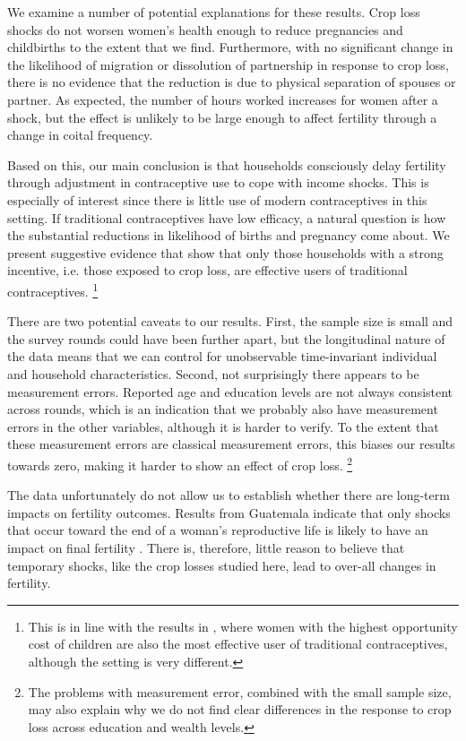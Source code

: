 \documentclass[letterpaper,12pt]{article}
\begin{document}
We examine a number of potential explanations for these results.
Crop loss shocks do not worsen women's health enough to 
reduce pregnancies and childbirths to the extent that we find.
Furthermore, with no significant change in the likelihood of migration or 
dissolution of partnership in response to crop loss, there is no evidence 
that the reduction is due to physical separation of spouses or partner.
As expected, the number of hours worked increases for women after a shock, 
but the effect is unlikely to be large enough to affect fertility 
through a change in coital frequency.

Based on this, our main conclusion is that households consciously delay 
fertility through adjustment in contraceptive use to cope 
with income shocks. 
This is especially of interest since there is little use of modern
contraceptives in this setting.
If traditional contraceptives have low efficacy, a natural question is 
how the substantial reductions in likelihood of births and pregnancy 
come about.
We present suggestive evidence that show that only those households
with a strong incentive, i.e. those exposed to crop loss, are 
effective users of traditional contraceptives.%
\footnote{
This is in line with the results in \cite{Rosenzweig1989},
where women with the highest opportunity cost of children
are also the most effective user of traditional contraceptives,
although the setting is very different.
}


There are two potential caveats to our results.
First, the sample size is small and the survey rounds
could have been further apart, but the longitudinal nature
of the data means that we can control for unobservable 
time-invariant individual and household characteristics.
Second, not surprisingly there appears to be measurement 
errors.
Reported age and education levels are not always consistent
across rounds, which is an indication that we probably also
have measurement errors in the other variables, although it is
harder to verify.
To the extent that these measurement errors are classical 
measurement errors, this biases our results towards zero,
making it harder to show an effect of crop loss.%
\footnote{
The problems with measurement error, combined with the small
sample size, may also explain why we do not find clear
differences in the response to crop loss across education
and wealth levels.
}

The data unfortunately do not allow us to establish whether there 
are long-term impacts on fertility outcomes.
Results from Guatemala indicate that only shocks that occur 
toward the end of a woman's reproductive life is likely to have an 
impact on final fertility \citep{Portner2014}.
There is, therefore, little reason to believe that temporary shocks,
like the crop losses studied here, lead to over-all changes in fertility.
\end{document}
